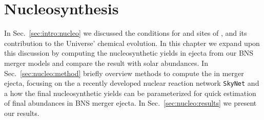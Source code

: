 
\chapter{Nucleosynthesis} \label{ch:nucleo}%




%
In Sec.~\ref{sec:intro:nucleo} we discussed the conditions for and sites of
\rproc{} \nuc{}, and its contribution to the Universe' chemical evolution. 
%
In this chapter we expand upon this discussion by computing the 
nucleosynthetic yields in ejecta from our \ac{BNS} merger models and 
compare the result with solar abundances.
%
In Sec.~\ref{sec:nucleo:method} briefly overview methods to compute the 
\rproc{} \nuc{} in merger ejecta, focusing on the 
a recently developed nuclear reaction network \texttt{SkyNet} 
\citep{Lippuner:2017tyn,Lippuner:2018phd} and a how 
the final nucleosynthetic yields can be parameterized for quick 
estimation of final abundances in \ac{BNS} merger ejecta.
%
In Sec.~\ref{sec:nucleo:results} we present our results.


